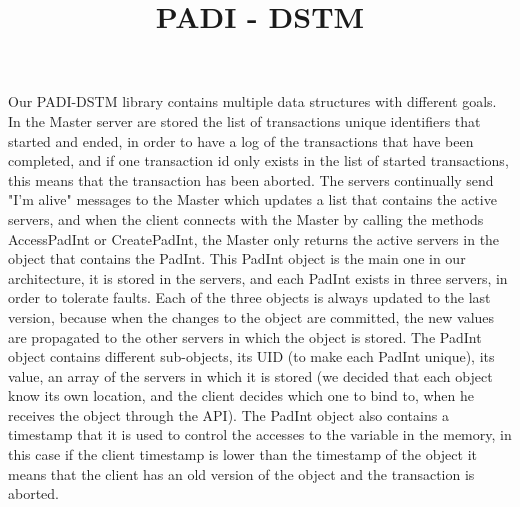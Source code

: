 \documentclass[times, 10pt,twocolumn]{article}
\begin{document}
\title{PADI - DSTM}



\maketitle
\thispagestyle{empty}











Our PADI-DSTM library contains multiple data structures with different goals. In the Master server are stored the list of transactions unique identifiers that started and ended, in order to have a log of the transactions that have been completed, and if one transaction id only exists in the list of started transactions, this means that the transaction has been aborted. The servers continually send "I'm alive" messages to the Master which updates a list that contains the active servers, and when the client connects with the Master by calling the methods AccessPadInt or CreatePadInt, the Master only returns the active servers in the object that contains the PadInt. This PadInt object is the main one in our architecture, it is stored in the servers, and each PadInt exists in three servers, in order to tolerate faults. Each of the three objects is always updated to the last version, because when the changes to the object are committed, the new values are propagated to the other servers in which the object is stored. The PadInt object contains different sub-objects, its UID (to make each PadInt unique), its value, an array of the servers in which it is stored (we decided that each object know its own location, and the client decides which one to bind to, when he receives the object through the API). The PadInt object also contains a timestamp that it is used to control the accesses to the variable in the memory, in this case if the client timestamp is lower than the timestamp of the object it means that the client has an old version of the object and the transaction is aborted.
\end{document}
